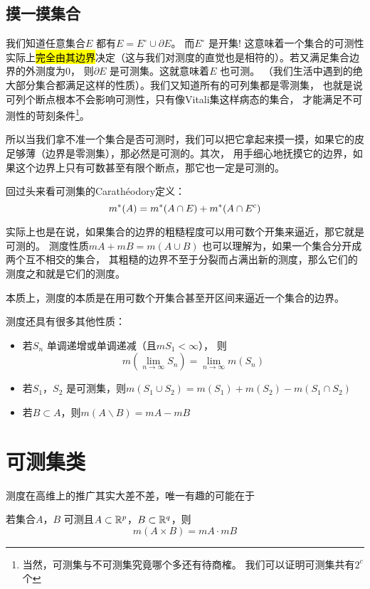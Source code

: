 \subsection{摸一摸集合}
我们知道任意集合\(E\) 都有\(E=E^{\circ} \cup \partial E\)。
而\(E^{\circ}\) 是开集!
这意味着一个集合的可测性实际上\hl{完全由其边界}决定（这与我们对测度的直觉也是相符的）。若又满足集合边界的外测度为0，
则\(\partial E\) 是可测集。这就意味着\(E\) 也可测。
（我们生活中遇到的绝大部分集合都满足这样的性质）。我们又知道所有的可列集都是零测集，
也就是说可列个断点根本不会影响可测性，只有像Vitali集这样病态的集合，
才能满足不可测性的苛刻条件\footnote{当然，可测集与不可测集究竟哪个多还有待商榷。
我们可以证明可测集共有\(2^{c}\) 个}。

所以当我们拿不准一个集合是否可测时，我们可以把它拿起来摸一摸，如果它的皮足够薄（边界是零测集），那必然是可测的。其次，
用手细心地抚摸它的边界，如果这个边界上只有可数甚至有限个断点，那它也一定是可测的。

回过头来看可测集的Carathéodory定义： \[
    m^{*}(A)=m^{*}(A\cap E)+m^{*}(A\cap E^{c})
\]

实际上也是在说，如果集合的边界的粗糙程度可以用可数个开集来逼近，那它就是可测的。
测度性质\(mA+mB=m(A\cup B)\) 也可以理解为，如果一个集合分开成两个互不相交的集合，
其粗糙的边界不至于分裂而占满出新的测度，那么它们的测度之和就是它们的测度。

本质上，测度的本质是在用可数个开集合甚至开区间来逼近一个集合的边界。

测度还具有很多其他性质：
\begin{itemize}
    \item 若\({S_{n}}\) 单调递增或单调递减（且\(mS_{1}<\infty\)），
        则\[m(\lim_{n \to \infty} S_{n})=\lim_{n\to
        \infty} m(S_{n})\]
    \item 若\(S_{1}\)，\(S_{2}\) 是可测集，则\(
        m(S_{1}\cup S_{2})=m(S_{1})+m(S_{2})-m(S_{1}\cap S_{2})\)
    \item 若\(B \subset A\)，则\(m(A \backslash B)=mA-mB\)
\end{itemize}
\section{可测集类}

测度在高维上的推广其实大差不差，唯一有趣的可能在于

\begin{theorem}
    若集合\(A\)，\(B\) 可测且\(A\subset \mathbb{R}^{p}\)，\(B \subset \mathbb{R}^{q} \)，则\[
        m(A\times B)=mA \cdot mB
    \]
\end{theorem}

